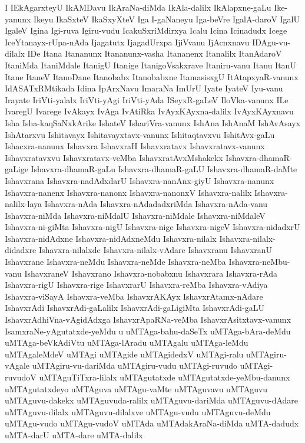 {I
IEkAgarxteyU
IkAMDavu
IkAraNa-diMda
IkAla-dalilx
IkAlapxne-gaLu
Ike-yanunx
Ikeyu
IkaSxteV
IkaSxyXteV
Iga
I-gaNaneyu
Iga-beVre
IgalA-daroV
IgalU
IgaleV
Igina
Igi-ruva
Igiru-vudu
IcakuSxriMdirxya
Icalu
Icina
Icinadudx
Icege
IceYtanayx-rUpa-nAda
Ijagatutx
IjagadUrxpa
IjiVvanu
IjAcnxnavu
IDAgu-vu-dilalx
IDe
Itana
Itananunx
Itananunx-vasha
Itananenx
Itanalilx
ItanAdaroV
ItaniMda
ItaniMdale
ItanigU
Itanige
ItanigoVsakxrave
Itaniru-vanu
Itanu
ItanU
Itane
ItaneV
ItanoDane
Itanobabx
Itanobabxne
ItamasisxgU
ItAtapxyaR-vanunx
IdASATxRMtikada
Idina
IpArxNavu
ImaraNa
ImUrU
Iyate
IyateV
Iyu-vanu
Irayate
IriVti-yalalx
IriVti-yAgi
IriVti-yAda
ISeyxR-gaLeV
IloVka-vanunx
ILe
IvaregU
Ivarege
IvAkayx
IvAga
IvAtiRka
IvAyxKAyxna-dalilx
IvAyxKAyxnavu
Isha
Isha-kaqSaNxkArike
IshateV
IshariVra-vanunx
IshAna
IshAnaM
IshAvAsayx
IshAtarxvu
Ishitavayx
Ishitavayxtavx-vanunx
Ishitaqtavxvu
IshitAvx-gaLu
Ishacxra-nanunx
Ishavxra
IshavxraH
Ishavxratavx
Ishavxratavx-vanunx
Ishavxratavxvu
Ishavxratavx-veMba
IshavxratAvxMshakekx
Ishavxra-dhamaR-gaLige
Ishavxra-dhamaR-gaLu
Ishavxra-dhamaR-gaLU
Ishavxra-dhamaR-daMte
Ishavxrana
Ishavxra-nadAdxdarU
Ishavxra-nanAnx-giyU
Ishavxra-nanunx
Ishavxra-nanenx
Ishavxra-nanonx
Ishavxra-nanonxV
Ishavxra-nalilx
Ishavxra-nalilx-laya
Ishavxra-nAda
Ishavxra-nAdadadxriMda
Ishavxra-nAda-vanu
Ishavxra-niMda
Ishavxra-niMdalU
Ishavxra-niMdale
Ishavxra-niMdaleV
Ishavxra-ni-giMta
Ishavxra-nigU
Ishavxra-nige
Ishavxra-nigeV
Ishavxra-nidadxrU
Ishavxra-nidAdxne
Ishavxra-nidAdxneMdu
Ishavxra-nilalx
Ishavxra-nilalx-didadxre
Ishavxra-nilalxde
Ishavxra-nilalx-vAdare
Ishavxranu
IshavxranU
Ishavxrane
Ishavxra-neMdu
Ishavxra-neMde
Ishavxra-neMba
Ishavxra-neMbu-vanu
IshavxraneV
Ishavxrano
Ishavxra-nobabxnu
Ishavxrara
Ishavxra-rAda
Ishavxra-rigU
Ishavxra-rige
IshavxrarU
Ishavxra-reMba
Ishavxra-vAdiya
Ishavxra-viSayA
Ishavxra-veMba
IshavxrAKAyx
IshavxrAtamx-nAdare
IshavxrAdi
IshavxrAdi-gaLalilx
IshavxrAdi-gaLigiMta
IshavxrAdi-gaLU
IshavxrAdhiVna-vAgidAdxga
IshavxrApaRNa-veMba
IshavxrAsitxtavx-vanunx
IsamxraNe-yAgutatxde-yeMdu
u
uMTAga-bahu-daSeTx
uMTAga-bAra-deMdu
uMTAga-beVkAdiVtu
uMTAga-lAradu
uMTAgalu
uMTAga-leMdu
uMTAgaleMdeV
uMTAgi
uMTAgide
uMTAgidedxV
uMTAgi-ralu
uMTAgiru-vAgale
uMTAgiru-vu-dariMda
uMTAgiru-vudu
uMTAgi-ruvudo
uMTAgi-ruvudoV
uMTAguTiTxra-lilalx
uMTAgutatxde
uMTAgutatxde-yeMbu-danunx
uMTAgutatxdeyo
uMTAguva
uMTAgu-vaMte
uMTAguvavu
uMTAguvu
uMTAguvu-dakekx
uMTAguvuda-ralilx
uMTAguvu-dariMda
uMTAguvu-dAdare
uMTAguvu-dilalx
uMTAguvu-dilalxve
uMTAgu-vudu
uMTAguvu-deMdu
uMTAgu-vudo
uMTAgu-vudoV
uMTAda
uMTAdakAraNa-diMda
uMTA-dadudx
uMTA-darU
uMTA-dare
uMTA-dalilx
}
